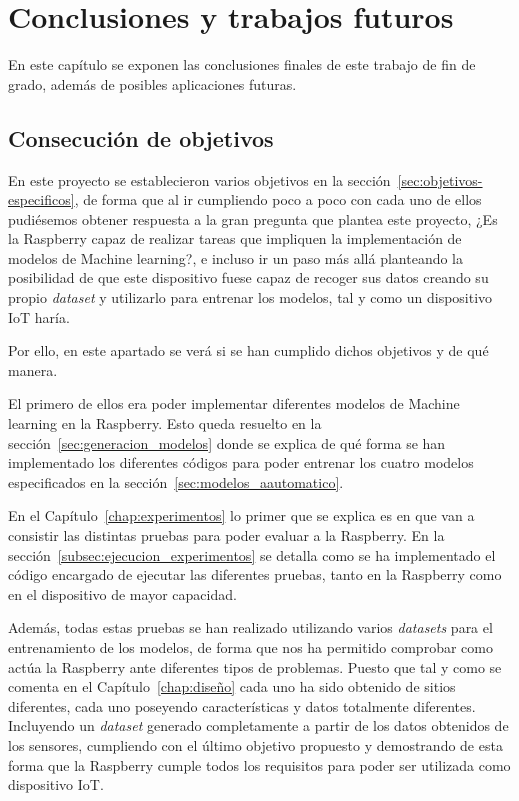 \documentclass[a4paper, 12pt]{book}
\begin{document}
\cleardoublepage



\chapter{Conclusiones y trabajos futuros}
\label{chap:conclusiones}

En este capítulo se exponen las conclusiones finales de este trabajo de fin de grado, además de posibles aplicaciones futuras.

\section{Consecución de objetivos}
\label{sec:consecucion-objetivos}

En este proyecto se establecieron varios objetivos en la sección~\ref{sec:objetivos-especificos}, de forma que al ir cumpliendo poco a poco con cada uno de ellos pudiésemos obtener respuesta a la gran pregunta que plantea este proyecto, ¿Es la Raspberry capaz de realizar tareas que impliquen la implementación de modelos de Machine learning?, e incluso ir un paso más allá planteando la posibilidad de que este dispositivo fuese capaz de recoger sus datos creando su propio \textit{dataset} y utilizarlo para entrenar los modelos, tal y como un dispositivo IoT haría.

Por ello, en este apartado se verá si se han cumplido dichos objetivos y de qué manera.

El primero de ellos era poder implementar diferentes modelos de Machine learning en la Raspberry. Esto queda resuelto en la sección~\ref{sec:generacion_modelos} donde se explica de qué forma se han implementado los diferentes códigos para poder entrenar los cuatro modelos especificados en la sección~\ref{sec:modelos_aautomatico}.

En el Capítulo~\ref{chap:experimentos} lo primer que se explica es en que van a consistir las distintas pruebas para poder evaluar a la Raspberry. En la sección~\ref{subsec:ejecucion_experimentos} se detalla como se ha implementado el código encargado de ejecutar las diferentes pruebas, tanto en la Raspberry como en el dispositivo de mayor capacidad.

Además, todas estas pruebas se han realizado utilizando varios \textit{datasets} para el entrenamiento de los modelos, de forma que nos ha permitido comprobar como actúa la Raspberry ante diferentes tipos de problemas. Puesto que tal y como se comenta en el Capítulo~\ref{chap:diseño} cada uno ha sido obtenido de sitios diferentes, cada uno poseyendo características y datos totalmente diferentes. Incluyendo un \textit{dataset} generado completamente a partir de los datos obtenidos de los sensores, cumpliendo con el último objetivo propuesto y demostrando de esta forma que la Raspberry cumple todos los requisitos para poder ser utilizada como dispositivo IoT.
\end{document}
